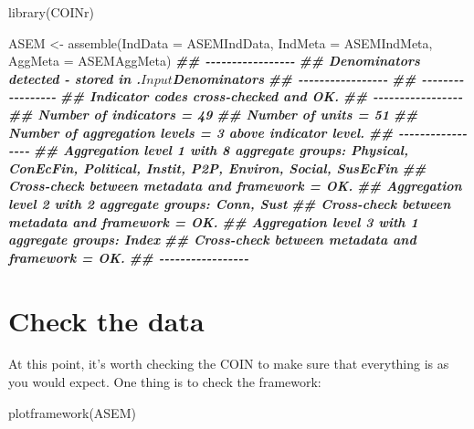 \documentclass[
]{book}
\newenvironment{Shaded}{\begin{snugshade}}{\end{snugshade}}
\newcommand{\AttributeTok}[1]{\textcolor[rgb]{0.77,0.63,0.00}{#1}}
\newcommand{\DocumentationTok}[1]{\textcolor[rgb]{0.56,0.35,0.01}{\textbf{\textit{#1}}}}
\newcommand{\FunctionTok}[1]{\textcolor[rgb]{0.00,0.00,0.00}{#1}}
\newcommand{\NormalTok}[1]{#1}
\newcommand{\OtherTok}[1]{\textcolor[rgb]{0.56,0.35,0.01}{#1}}
\begin{document}
\begin{Shaded}
\begin{Highlighting}[]
\FunctionTok{library}\NormalTok{(COINr)}

\NormalTok{ASEM }\OtherTok{\textless{}{-}} \FunctionTok{assemble}\NormalTok{(}\AttributeTok{IndData =}\NormalTok{ ASEMIndData,}
                 \AttributeTok{IndMeta =}\NormalTok{ ASEMIndMeta,}
                 \AttributeTok{AggMeta =}\NormalTok{ ASEMAggMeta)}
\DocumentationTok{\#\# {-}{-}{-}{-}{-}{-}{-}{-}{-}{-}{-}{-}{-}{-}{-}{-}{-}}
\DocumentationTok{\#\# Denominators detected {-} stored in .$Input$Denominators}
\DocumentationTok{\#\# {-}{-}{-}{-}{-}{-}{-}{-}{-}{-}{-}{-}{-}{-}{-}{-}{-}}
\DocumentationTok{\#\# {-}{-}{-}{-}{-}{-}{-}{-}{-}{-}{-}{-}{-}{-}{-}{-}{-}}
\DocumentationTok{\#\# Indicator codes cross{-}checked and OK.}
\DocumentationTok{\#\# {-}{-}{-}{-}{-}{-}{-}{-}{-}{-}{-}{-}{-}{-}{-}{-}{-}}
\DocumentationTok{\#\# Number of indicators = 49}
\DocumentationTok{\#\# Number of units = 51}
\DocumentationTok{\#\# Number of aggregation levels = 3 above indicator level.}
\DocumentationTok{\#\# {-}{-}{-}{-}{-}{-}{-}{-}{-}{-}{-}{-}{-}{-}{-}{-}{-}}
\DocumentationTok{\#\# Aggregation level 1 with 8 aggregate groups: Physical, ConEcFin, Political, Instit, P2P, Environ, Social, SusEcFin}
\DocumentationTok{\#\# Cross{-}check between metadata and framework = OK.}
\DocumentationTok{\#\# Aggregation level 2 with 2 aggregate groups: Conn, Sust}
\DocumentationTok{\#\# Cross{-}check between metadata and framework = OK.}
\DocumentationTok{\#\# Aggregation level 3 with 1 aggregate groups: Index}
\DocumentationTok{\#\# Cross{-}check between metadata and framework = OK.}
\DocumentationTok{\#\# {-}{-}{-}{-}{-}{-}{-}{-}{-}{-}{-}{-}{-}{-}{-}{-}{-}}
\end{Highlighting}
\end{Shaded}

\hypertarget{check-the-data}{%
\section{Check the data}\label{check-the-data}}

At this point, it's worth checking the COIN to make sure that everything is as you would expect. One thing is to check the framework:

\begin{Shaded}
\begin{Highlighting}[]
\FunctionTok{plotframework}\NormalTok{(ASEM)}
\end{Highlighting}
\end{Shaded}
\end{document}
